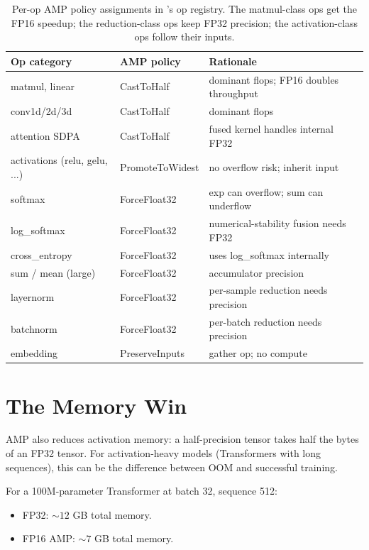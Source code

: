 \begin{table}[t]
\centering
\small
\begin{tabular}{lll}
\toprule
Op category & AMP policy & Rationale \\
\midrule
matmul, linear        & CastToHalf       & dominant flops; FP16 doubles throughput \\
conv1d/2d/3d          & CastToHalf       & dominant flops \\
attention SDPA        & CastToHalf       & fused kernel handles internal FP32 \\
activations (relu, gelu, ...) & PromoteToWidest & no overflow risk; inherit input \\
softmax               & ForceFloat32     & exp can overflow; sum can underflow \\
log\_softmax          & ForceFloat32     & numerical-stability fusion needs FP32 \\
cross\_entropy        & ForceFloat32     & uses log\_softmax internally \\
sum / mean (large)    & ForceFloat32     & accumulator precision \\
layernorm             & ForceFloat32     & per-sample reduction needs precision \\
batchnorm             & ForceFloat32     & per-batch reduction needs precision \\
embedding             & PreserveInputs   & gather op; no compute \\
\bottomrule
\end{tabular}
\caption[AMP policy assignments.]{Per-op AMP policy assignments
in \Lucid's op registry. The matmul-class ops get the FP16
speedup; the reduction-class ops keep FP32 precision; the
activation-class ops follow their inputs.}
\label{tab:amp:policy}
\end{table}

\section{The Memory Win}
\label{sec:amp:memory_win}

AMP also reduces activation memory: a half-precision tensor takes
half the bytes of an FP32 tensor. For activation-heavy models
(Transformers with long sequences), this can be the difference
between OOM and successful training.

For a 100M-parameter Transformer at batch 32, sequence 512:
\begin{itemize}
  \item FP32: $\sim 12$ GB total memory.
  \item FP16 AMP: $\sim 7$ GB total memory.
\end{itemize}

